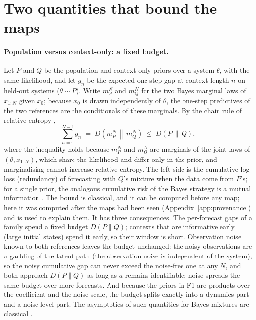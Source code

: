 \section{Two quantities that bound the maps}\label{sec:theory}
\paragraph{Population versus context-only: a fixed budget.} Let $P$ and $Q$ be the population and context-only priors over a
system $\theta$, with the same likelihood, and let $g_n$ be the expected one-step gap at context length $n$ on held-out
systems ($\theta\sim P$). Write $m_P^N$ and $m_Q^N$ for the two Bayes marginal laws of $x_{1:N}$ given $x_0$; because $x_0$ is
drawn independently of $\theta$, the one-step predictives of the two references are the conditionals of these marginals. By the
chain rule of relative entropy \citep{cover2006},
\[
\textstyle\sum_{n=0}^{N-1} g_n \;=\; D\!\left(m_P^N \,\middle\|\, m_Q^N\right) \;\le\; D(P\,\|\,Q),
\]
where the inequality holds because $m_P^N$ and $m_Q^N$ are marginals of the joint laws of $(\theta,x_{1:N})$, which share the
likelihood and differ only in the prior, and marginalising cannot increase relative entropy. The left side is the cumulative
log loss (redundancy) of forecasting with $Q$'s mixture when the data come from $P$'s; for a single prior, the analogous
cumulative risk of the Bayes strategy is a mutual information \citep{haussler1997}. The bound is classical, and it can be
computed before any map; here it was computed after the maps had been seen (Appendix~\ref{app:provenance}) and is used to
explain them. It has three consequences. The per-forecast gaps of a family spend a
fixed budget $D(P\|Q)$; contexts that are informative early (large initial states) spend it early, so their window is
short. Observation noise known to both references leaves the budget unchanged: the noisy observations are a garbling of the
latent path (the observation noise is independent of the system), so the noisy cumulative gap can never exceed the noise-free
one at any $N$, and both approach $D(P\|Q)$ as long as $a$ remains identifiable; noise spreads the same budget over more
forecasts. And because the priors in F1 are products over the coefficient and the noise scale, the budget splits exactly into
a dynamics part and a noise-level part. The asymptotics of such quantities for Bayes mixtures are classical
\citep{clarke1990}.

